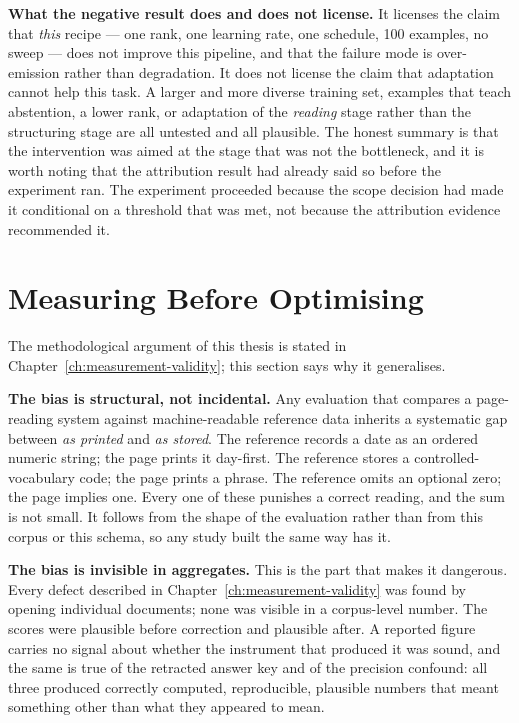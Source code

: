 \textbf{What the negative result does and does not license.} It licenses the claim that
\emph{this} recipe --- one rank, one learning rate, one schedule, 100 examples, no sweep --- does
not improve this pipeline, and that the failure mode is over-emission rather than degradation.
It does not license the claim that adaptation cannot help this task. A larger and more diverse
training set, examples that teach abstention, a lower rank, or adaptation of the \emph{reading}
stage rather than the structuring stage are all untested and all plausible. The honest summary is
that the intervention was aimed at the stage that was not the bottleneck, and it is worth
noting that the attribution result had already said so before the experiment ran. The experiment
proceeded because the scope decision had made it conditional on a threshold that was met, not
because the attribution evidence recommended it.

\section{Measuring Before Optimising}
\label{sec:disc-measurement}

The methodological argument of this thesis is stated in Chapter~\ref{ch:measurement-validity};
this section says why it generalises.

\textbf{The bias is structural, not incidental.} Any evaluation that compares a
page-reading system against machine-readable reference data inherits a systematic gap between
\emph{as printed} and \emph{as stored}. The reference records a date as an ordered numeric
string; the page prints it day-first. The reference stores a controlled-vocabulary code; the page
prints a phrase. The reference omits an optional zero; the page implies one. Every one of these
punishes a correct reading, and the sum is not small. It follows from the shape of the
evaluation rather than from this corpus or this schema, so any study built the same way has
it.

\textbf{The bias is invisible in aggregates.} This is the part that makes it dangerous. Every
defect described in Chapter~\ref{ch:measurement-validity} was found by opening individual
documents; none was visible in a corpus-level number. The scores were plausible before
correction and plausible after. A reported figure carries no signal about whether the instrument
that produced it was sound, and the same is true of the retracted answer key and of the
precision confound: all three produced correctly computed, reproducible, plausible numbers that
meant something other than what they appeared to mean.

